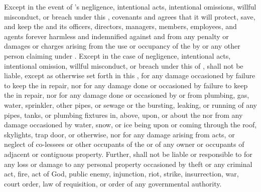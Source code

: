 Except in the event of \lessor's negligence, intentional acts, intentional omissions, willful misconduct, or breach under this \lease, \lessee covenants and agrees that it will protect, save, and keep the \lessor  and its officers, directors, managers, members, employees, and agents forever harmless and indemnified against and from any penalty or damages or charges arising from the use or occupancy of the \premises by \lessee or any other person claiming under \lessee. Except in the case of negligence, intentional acts, intentional omission, willful misconduct, or breach under this \lease of \lessor, \lessor shall not be liable, except as otherwise set forth in this \lease, for any damage occasioned by failure to keep the \premises in repair, nor for any damage done or occasioned by failure to keep the \premises in repair, nor for any damage done or occasioned by or from plumbing, gas, water, sprinkler, other pipes, or sewage or the bursting, leaking, or running of any pipes, tanks, or plumbing fixtures in, above, upon, or about the \premises nor from any damage occasioned by water, snow, or ice being upon or coming through the roof, skylights, trap door, or otherwise, nor for any damage arising from acts, or neglect of co-lessees or other occupants of the \building or of any owner or occupants of adjacent or contiguous property. Further, \lessor shall not be liable or responsible to \lessee for any loss or damage to any personal property occasioned by theft or any criminal act, fire, act of God, public enemy, injunction, riot, strike, insurrection, war, court order, law of requisition, or order of any governmental authority.
